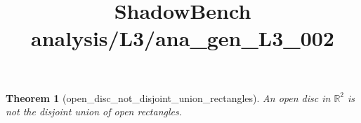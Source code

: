 \documentclass{article}
\title{ShadowBench analysis/L3/ana\_gen\_L3\_002}
\newtheorem{theorem}{Theorem}
\begin{document}
\maketitle

\begin{theorem}[open_disc_not_disjoint_union_rectangles]
An open disc in $\mathbb{R}^2$ is not the disjoint union of open rectangles. \\
\end{theorem}
\end{document}
